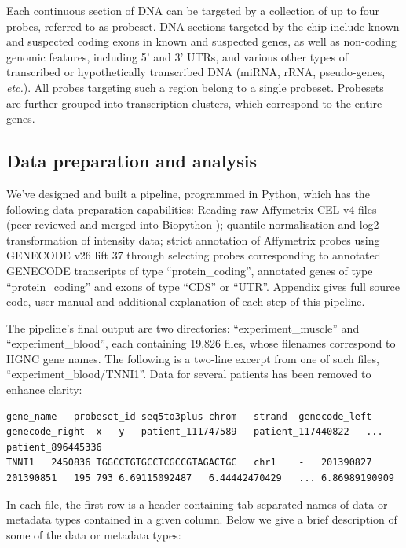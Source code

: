 \documentclass[10pt,letterpaper]{article}
\begin{document}
Each continuous section of DNA can be targeted by a collection of up to four probes, referred to as probeset. DNA sections targeted by the chip include known and suspected coding exons in known and suspected genes, as well as non-coding genomic features, including 5' and 3' UTRs, and various other types of transcribed or hypothetically transcribed DNA (miRNA, rRNA, pseudo-genes, {\it etc.}). All probes targeting such a region belong to a single probeset. Probesets are further grouped into transcription clusters, which correspond to the entire genes.

\subsection*{Data preparation and analysis}
\label{data_preparation}
We've designed and built a pipeline, programmed in Python, which has the following data preparation capabilities:
Reading raw Affymetrix CEL v4 files (peer reviewed and merged into Biopython\cite{Cock2009} \cite{Kurkiewicz2016});
quantile normalisation and log2 transformation of intensity data;
strict annotation of Affymetrix probes using GENECODE v26 lift 37 through selecting probes corresponding to annotated GENECODE transcripts of type ``protein\_coding'', annotated genes of type ``protein\_coding'' and exons of type ``CDS'' or ``UTR''. Appendix  gives full source code, user manual and additional explanation of each step of this pipeline.

The pipeline's final output are two directories: ``experiment\_muscle'' and ``experiment\_blood'', each containing 19,826 files, whose filenames correspond to HGNC gene names. The following is a two-line excerpt from one of such files, ``experiment\_blood/TNNI1''. Data for several patients has been removed to enhance clarity:

\begin{lstlisting}[breaklines=true, frame=single, postbreak=\mbox{\textcolor{red}{$\hookrightarrow$}\space}]
gene_name	probeset_id	seq5to3plus	chrom	strand	genecode_left	genecode_right	x	y	patient_111747589	patient_117440822	...	patient_896445336
TNNI1	2450836	TGGCCTGTGCCTCGCCGTAGACTGC	chr1	-	201390827	201390851	195	793	6.69115092487	6.44442470429	...	6.86989190909
\end{lstlisting}

In each file, the first row is a header containing tab-separated names of data or metadata types contained in a given column. Below we give a brief description of some of the data or metadata types:
\end{document}
